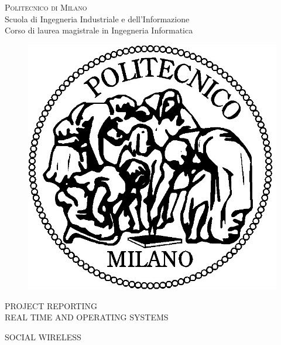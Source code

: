 \documentclass[11pt,a4paper,oneside]{article}
\begin{document}
\thispagestyle{empty}
\enlargethispage{60mm}
\begin{center}
\Large{\textsc{Politecnico di Milano}}\\
\large{Scuola di Ingegneria Industriale e dell'Informazione}\\
\large{Corso di laurea magistrale in Ingegneria Informatica}\\
\vspace{7mm}
\begin{figure}[h]
\begin{center}
\includegraphics[scale=0.15]{./Immagini/logo-polimi}
\end{center}
\end{figure}
\vspace{2mm}

\begin{large}
PROJECT REPORTING\\REAL TIME AND OPERATING SYSTEMS
\end{large}
\vspace{25mm}


\begin{large}
SOCIAL WIRELESS\\
\end{large}
\vspace{20mm}



\end{center}
\end{document}
